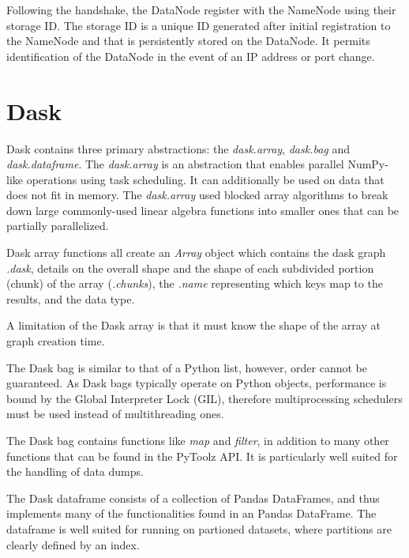 \documentclass{report}
\begin{document}
        Following the handshake, the DataNode register with the NameNode using
        their storage ID. The storage ID is a unique ID generated after initial
        registration to the NameNode and that is persistently stored on the
        DataNode. It permits identification of the DataNode in the event of an
        IP address or port change. 
        
        \section{Dask}
            Dask contains three primary abstractions: the \textit{dask.array}, 
            \textit{dask.bag} and \textit{dask.dataframe}. The 
            \textit{dask.array} is an abstraction that enables parallel 
            NumPy-like operations using task scheduling. It can additionally be 
            used on data that does not fit in memory. The \textit{dask.array} 
            used blocked array algorithms to break down large commonly-used 
            linear algebra functions into smaller ones that can be partially 
            parallelized.

            Dask array functions all create an \textit{Array} object which 
            contains the dask graph \textit{.dask}, details on the overall shape
            and the shape of each subdivided portion (chunk) of the array 
            (\textit{.chunks}), the \textit{.name} representing which keys map 
            to the results, and the data type.

            A limitation of the Dask array is that it must know the shape of the 
            array at graph creation time.

            The Dask bag is similar to that of a Python list, however, order 
            cannot be guaranteed. As Dask bags typically operate on Python 
            objects, performance is bound by the Global Interpreter Lock (GIL), 
            therefore multiprocessing schedulers must be used instead of 
            multithreading ones.

            The Dask bag contains functions like \textit{map} and 
            \textit{filter}, in addition to many other functions that can be 
            found in the PyToolz API. It is particularly well suited for the 
            handling of data dumps.

            The Dask dataframe consists of a collection of Pandas DataFrames, 
            and thus implements many of the functionalities found in an Pandas 
            DataFrame. The dataframe is well suited for running on partioned 
            datasets, where partitions are clearly defined by an index.
\end{document}
